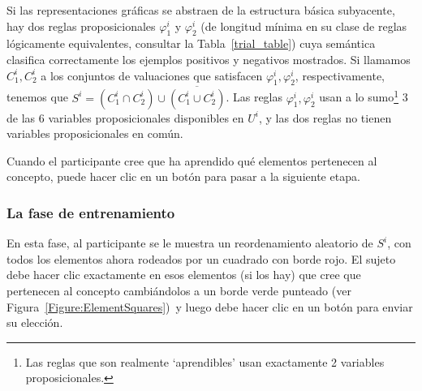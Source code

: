 Si las representaciones gráficas se abstraen de la estructura básica subyacente, hay dos reglas proposicionales $ \varphi^i_1 $ y $ \varphi^i_2 $ (de longitud mínima en su clase de reglas lógicamente equivalentes, consultar la Tabla~\ref{trial_table}) cuya semántica clasifica correctamente los ejemplos positivos y negativos mostrados. Si llamamos $ C^i_1, C^i_2 $ a los conjuntos de valuaciones que satisfacen $ \varphi^i_1, \varphi^i_2 $, respectivamente, tenemos que $ S^i = (C^i_1 \cap C^i_2) \cup \overline {(C^i_1 \cup C^i_2)} $. Las reglas $ \varphi^i_1, \varphi^i_2 $ usan a lo sumo\footnote{Las reglas que son realmente `aprendibles' usan exactamente 2 variables proposicionales.} 3 de las 6 variables proposicionales disponibles en $ U^i $, y las dos reglas no tienen variables proposicionales en común.

Cuando el participante cree que ha aprendido qué elementos pertenecen al concepto, puede hacer clic en un botón para pasar a la siguiente etapa.

\subsubsection{La fase de entrenamiento}\label{Subsection:training}

En esta fase, al participante se le muestra un reordenamiento aleatorio de $S^i $, con todos los elementos ahora rodeados por un cuadrado con borde rojo. El sujeto debe hacer clic exactamente en esos elementos (si los hay) que cree que pertenecen al concepto \textemdash cambiándolos a un borde verde punteado (ver Figura~\ref{Figure:ElementSquares})\textemdash \ y luego debe hacer clic en un botón para enviar su elección.

